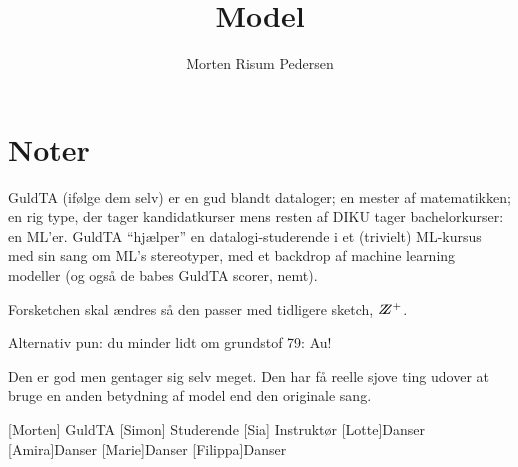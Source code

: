 \documentclass{article}
\title{Model}
\author{Morten Risum Pedersen}
\begin{document}
\maketitle
\section*{Noter}
GuldTA (ifølge dem selv) er en gud blandt dataloger; en mester af matematikken; en rig type, der tager kandidatkurser mens resten af DIKU tager bachelorkurser: en ML'er. GuldTA ``hjælper'' en datalogi-studerende i et (trivielt) ML-kursus med sin sang om ML's stereotyper, med et backdrop af machine learning modeller (og også de babes GuldTA scorer, nemt).

Forsketchen skal ændres så den passer med tidligere sketch, $Z\kern-4.7ptZ^+$.

Alternativ pun: du minder lidt om grundstof 79: Au!

Den er god men gentager sig selv meget. Den har få reelle sjove ting udover at bruge en anden betydning af model end den originale sang.



\begin{roles}
[Morten] GuldTA
[Simon] Studerende
[Sia] Instruktør
[Lotte]{Danser}
[Amira]{Danser}
[Marie]{Danser}
[Filippa]{Danser}
\end{roles} 



\begin{props}
\end{props}
\end{document}
